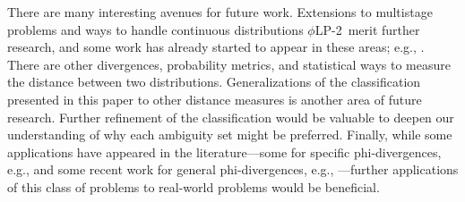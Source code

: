 \documentclass[opre,nonblindrev]{informs3} %
\newcommand{\plp}{$\phi$LP-2}
\begin{document}
There are many interesting avenues for future work. 
Extensions to multistage problems and ways to handle continuous distributions \plp\ merit further research, and some work has already started to appear in these areas; e.g., \cite{hukullback,jiang2015variation}. 
There are other divergences, probability metrics, and statistical ways to measure the distance between two distributions. 
Generalizations of the classification presented in this paper to other distance measures is another area of future research. 
Further refinement of the classification would be valuable to deepen our understanding of why each ambiguity set might be preferred. 
Finally, while some applications have appeared in the literature---some for specific phi-divergences, e.g., \cite{calafiore2007ambiguous,klabjan2013robust} and some recent work for general phi-divergences, e.g., \cite{love_bayraksan_w_15}---further applications of this class of problems to real-world problems would be beneficial. 

\theendnotes


\end{document}
